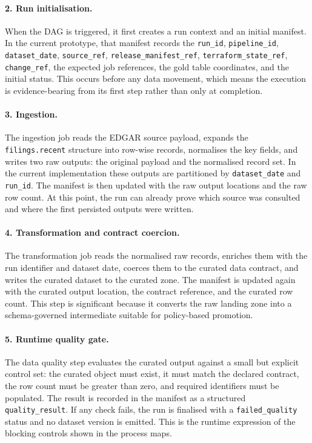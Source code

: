 \paragraph{2. Run initialisation.}
When the DAG is triggered, it first creates a run context and an initial
manifest. In the current prototype, that manifest records the
\texttt{run\_id}, \texttt{pipeline\_id}, \texttt{dataset\_date},
\texttt{source\_ref}, \texttt{release\_manifest\_ref},
\texttt{terraform\_state\_ref}, \texttt{change\_ref}, the expected job
references, the gold table coordinates, and the initial status. This occurs
before any data movement, which means the execution is evidence-bearing from
its first step rather than only at completion.

\paragraph{3. Ingestion.}
The ingestion job reads the EDGAR source payload, expands the
\texttt{filings.recent} structure into row-wise records, normalises the key
fields, and writes two raw outputs: the original payload and the normalised
record set. In the current implementation these outputs are partitioned by
\texttt{dataset\_date} and \texttt{run\_id}. The manifest is then updated with
the raw output locations and the raw row count. At this point, the run can
already prove which source was consulted and where the first persisted outputs
were written.

\paragraph{4. Transformation and contract coercion.}
The transformation job reads the normalised raw records, enriches them with the
run identifier and dataset date, coerces them to the curated data contract, and
writes the curated dataset to the curated zone. The manifest is updated again
with the curated output location, the contract reference, and the curated row
count. This step is significant because it converts the raw landing zone into a
schema-governed intermediate suitable for policy-based promotion.

\paragraph{5. Runtime quality gate.}
The data quality step evaluates the curated output against a small but explicit
control set: the curated object must exist, it must match the declared
contract, the row count must be greater than zero, and required identifiers
must be populated. The result is recorded in the manifest as a structured
\texttt{quality\_result}. If any check fails, the run is finalised with a
\texttt{failed\_quality} status and no dataset version is emitted. This is the
runtime expression of the blocking controls shown in the process maps.

